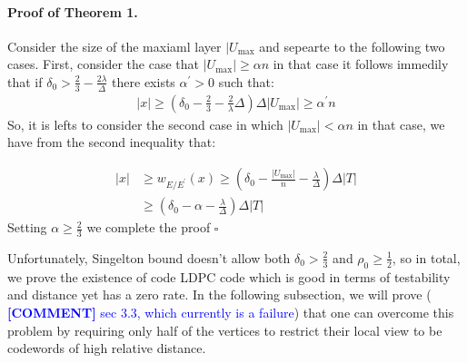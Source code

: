 \documentclass{article}
\newcommand{\commentt}[1]{\textcolor{blue}{ \textbf{[COMMENT]} #1}}
\newcommand{\ctt}[1]{\commentt{#1}}
\begin{document}
\begin{multicols*}{2}
  \paragraph{Proof of Theorem 1.} Consider the size of the maxiaml layer $|U_{\max}$ and sepearte to the following two cases. First, consider the case that $|U_{\max}| \ge  \alpha n $ in that case it follows immedily that if $\delta_{0} > \frac{2}{3} - \frac{2\lambda}{\Delta}$ there exists $\alpha^{\prime} > 0 $ such that:  
  \begin{equation*}
    \begin{split}
      |x| \ge \left( \delta_{0} - \frac{2}{3} - \frac{2}{\lambda}\Delta \right)\Delta|U_{\max}| \ge  \alpha^{\prime} n 
    \end{split}
  \end{equation*}
  So, it is lefts to consider the second case in which $ |U_{\max}| < \alpha n $ in that case, we have from the second inequality that: 

  \begin{equation*}
    \begin{split}
      |x| & \ge  w_{E/E^{\prime}}\left( x \right)  \ge \left( \delta_{0} - \frac{|U_{\max}|}{n} - \frac{\lambda}{\Delta} \right) \Delta|T| \\ 
      & \ge \left( \delta_{0} - \alpha - \frac{\lambda}{\Delta} \right) \Delta|T| 
    \end{split}
  \end{equation*}
  Setting $\alpha \ge \frac{2}{3}$ we complete the proof $\square$

  Unfortunately, Singelton bound doesn't allow both $\delta_0 > \frac{2}{3}$ and $\rho_0 \ge \frac{1}{2}$, so in total, we prove the existence of code LDPC code which is good in terms of testability and distance yet has a zero rate. In the following subsection, we will prove (\ctt{sec 3.3, which currently is a failure}) that one can overcome this problem by requiring only half of the vertices to restrict their local view to be codewords of high relative distance. 



\end{multicols*}
\end{document}
